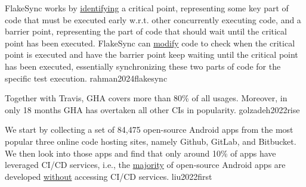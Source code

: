 \documentclass{article}
\begin{document}
  {FlakeSync works by \ul{identifying} a critical point, representing some key part of code that must be executed early w.r.t. other concurrently executing code, and a barrier point, representing the part of code that should wait until the critical point has been executed. FlakeSync can \ul{modify} code to check when the critical point is executed and have the barrier point keep waiting until the critical point has been executed, essentially synchronizing these two parts of code for the specific test execution.}
  {rahman2024flakesync}


  {Together with Travis, GHA covers more than 80\% of all usages. Moreover, in only 18 months GHA has overtaken all other CIs in popularity.}
  {golzadeh2022rise}

  {We start by collecting a set of 84,475 open-source Android apps from the most popular three online code hosting sites, namely Github, GitLab, and Bitbucket. We then look into those apps and find that only around 10\% of apps have leveraged CI/CD services, i.e., the \ul{majority} of open-source Android apps are developed \ul{without} accessing CI/CD services.}
  {liu2022first}
\end{document}

